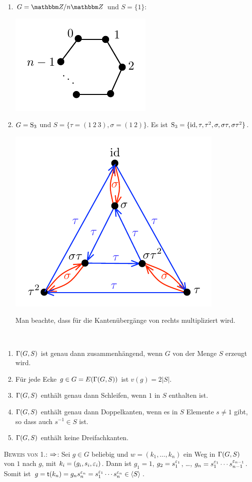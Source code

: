 \documentclass[a4paper, 12pt, twoside]{article}
\begin{document}
\begin{enumerate}
\item $G=\ZZ/n\ZZ$ und $S=\{1\}$:
\begin{center}
	\includegraphics{grugraImages/cay4}
\end{center}
\item $G=\mathrm{S}_3$ und $S=\{\tau=(1\ 2\ 3),\sigma=(1\ 2)\}$.
Es ist $\mathrm{S}_3=\{\mathrm{id},\tau,\tau^2,\sigma,\sigma\tau,\sigma\tau^2\}$.
\begin{center}
	\includegraphics{grugraImages/cay5}
\end{center}
Man beachte, dass für die Kantenübergänge von rechts multipliziert 
wird.
\end{enumerate}

\BEM\label{bem_GRGS}\
\begin{enumerate}
\item $\Gamma(G,S)$ ist genau dann zusammenhängend, wenn
$G$ von der Menge $S$ erzeugt wird.
\item Für jede Ecke $g\in G=E(\Gamma(G,S))$ ist $v(g)=2|S|$.
\item $\Gamma(G,S)$ enthält genau dann Schleifen, wenn $1$ in $S$
enthalten ist.
\item $\Gamma(G,S)$ enthält genau dann Doppelkanten, wenn es in $S$
Elemente $s\neq 1$ gibt, so dass auch $s^{-1}\in S$ ist.
\item $\Gamma(G,S)$ enthält keine Dreifachkanten.
\end{enumerate}
\textsc{Beweis von 1.:} \glqq$\Rightarrow$\grqq: Sei $g\in G$ beliebig und
$w=(k_1,\ldots,k_n)$ ein Weg in $\Gamma(G,S)$ von $1$ nach $g$,
mit $k_i=(g_i, s_i, \varepsilon_i)$. Dann ist
$g_1=1$, $g_2=s_1^{\varepsilon_1}$, \ldots,
$g_n=s_1^{\varepsilon_1}\cdots s_{n-1}^{\varepsilon_{n-1}}$.
Somit ist $g=\mathsf{t}(k_n)=g_n s_n^{\varepsilon_n}=
s_1^{\varepsilon_1}\cdots s_n^{\varepsilon_n} \in\langle S\rangle$.
\end{document}

